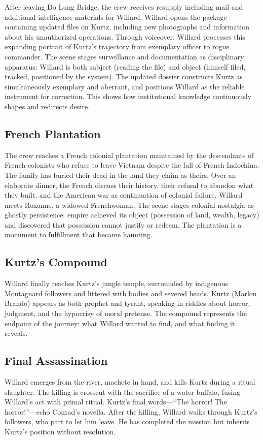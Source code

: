 After leaving Do Lung Bridge, the crew receives resupply including mail and additional
intelligence materials for Willard. Willard opens the package containing updated files on Kurtz,
including new photographs and information about his unauthorized operations. Through voiceover,
Willard processes this expanding portrait of Kurtz's trajectory from exemplary officer to rogue
commander. The scene stages surveillance and documentation as disciplinary apparatus: Willard is
both subject (reading the file) and object (himself filed, tracked, positioned by the system).
The updated dossier constructs Kurtz as simultaneously exemplary and aberrant, and positions
Willard as the reliable instrument for correction. This shows how institutional knowledge
continuously shapes and redirects desire.

\subsection*{French Plantation}
\label{scene:french-plantation}

The crew reaches a French colonial plantation maintained by the descendants of French colonists
who refuse to leave Vietnam despite the fall of French Indochina. The family has buried their
dead in the land they claim as theirs. Over an elaborate dinner, the French discuss their
history, their refusal to abandon what they built, and the American war as continuation of
colonial failure. Willard meets Roxanne, a widowed Frenchwoman. The scene stages colonial
nostalgia as ghostly persistence: empire achieved its object (possession of land, wealth,
legacy) and discovered that possession cannot justify or redeem. The plantation is a monument
to fulfillment that became haunting.

\subsection*{Kurtz's Compound}
\label{scene:kurtz-compound}

Willard finally reaches Kurtz's jungle temple, surrounded by indigenous Montagnard followers
and littered with bodies and severed heads. Kurtz (Marlon Brando) appears as both prophet and
tyrant, speaking in riddles about horror, judgment, and the hypocrisy of moral pretense. The
compound represents the endpoint of the journey: what Willard wanted to find, and what finding
it reveals.

\subsection*{Final Assassination}
\label{scene:assassination}

Willard emerges from the river, machete in hand, and kills Kurtz during a ritual slaughter.
The killing is crosscut with the sacrifice of a water buffalo, fusing Willard's act with
primal ritual. Kurtz's final words---``The horror! The horror!''---echo Conrad's novella.
After the killing, Willard walks through Kurtz's followers, who part to let him leave. He has
completed the mission but inherits Kurtz's position without resolution.
